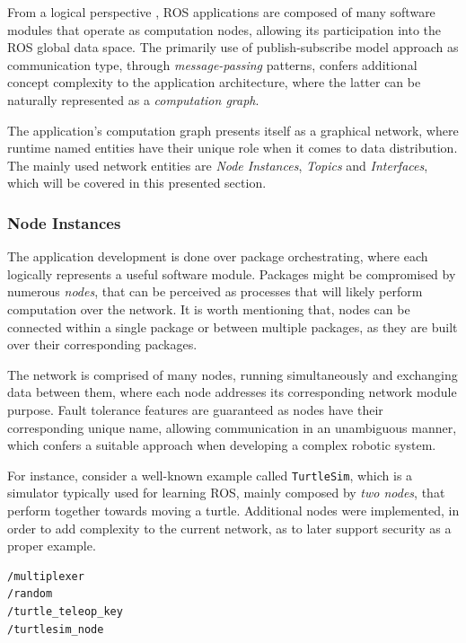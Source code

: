 From a logical perspective \cite{casini2019response}, ROS applications are composed of many software modules that operate as computation nodes, allowing its participation into the ROS global data space. The primarily use of publish-subscribe model approach as communication type, through \textit{message-passing} patterns, confers additional concept complexity to the application architecture, where the latter can be naturally represented as a \textit{computation graph}. 

The application's computation graph presents itself as a graphical network, where runtime named entities have their unique role when it comes to data distribution. The mainly used network entities are \textit{Node Instances}, \textit{Topics} and \textit{Interfaces}, which will be covered in this presented section.

\subsubsection{Node Instances}

The application development is done over package orchestrating, where each logically represents a useful software module. Packages might be compromised by numerous \textit{nodes}, that can be perceived as processes that will likely perform computation over the network. It is worth mentioning that, nodes can be connected within a single package or between multiple packages, as they are built over their corresponding packages.

The network is comprised of many nodes, running simultaneously and exchanging data between them, where each node addresses its corresponding network module purpose. Fault tolerance features are guaranteed as nodes have their corresponding unique name, allowing communication in an unambiguous manner, which confers a suitable approach when developing a complex robotic system.

For instance, consider a well-known example called \texttt{TurtleSim}, which is a simulator typically used for learning ROS, mainly composed by \textit{two nodes}, that perform together towards moving a turtle. Additional nodes were implemented, in order to add complexity to the current network, as to later support security as a proper example. %

\begin{lstlisting}[title={The \texttt{TurtleSim} node list.}]
/multiplexer
/random
/turtle_teleop_key
/turtlesim_node
\end{lstlisting}

